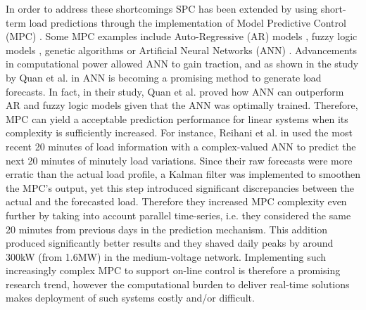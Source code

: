 In order to address these shortcomings SPC has been extended by using short-term load predictions through the implementation of Model Predictive Control (MPC) \cite{Gybel2012, Hatziargyriou2015}.
Some MPC examples include Auto-Regressive (AR) models \cite{Li2009, Nie2011}, fuzzy logic models \cite{Sannomiya2001, Chen2013a}, genetic algorithms \cite{Xia2015a, Liu2015} or Artificial Neural Networks (ANN) \cite{Kalogirou2014, Quan2014, Lee2014, Pezeshki2014, Vaz2016, Reihani2016, Xiao2017}.
Advancements in computational power allowed ANN to gain traction, and as shown in the study by Quan et al. in \cite{Quan2014} ANN is becoming a promising method to generate load forecasts.
In fact, in their study, Quan et al. proved how ANN can outperform AR and fuzzy logic models given that the ANN was optimally trained.
Therefore, MPC can yield a acceptable prediction performance for linear systems when its complexity is sufficiently increased.
For instance, Reihani et al. in \cite{Reihani2016} used the most recent 20 minutes of load information with a complex-valued ANN to predict the next 20 minutes of minutely load variations.
Since their raw forecasts were more erratic than the actual load profile, a Kalman filter was implemented to smoothen the MPC's output, yet this step introduced significant discrepancies between the actual and the forecasted load.
Therefore they increased MPC complexity even further by taking into account parallel time-series, i.e. they considered the same 20 minutes from previous days in the prediction mechanism.
This addition produced significantly better results and they shaved daily peaks by around 300kW (from 1.6MW) in the medium-voltage network.
Implementing such increasingly complex MPC to support on-line control is therefore a promising research trend, however the computational burden to deliver real-time solutions makes deployment of such systems costly and/or difficult.

